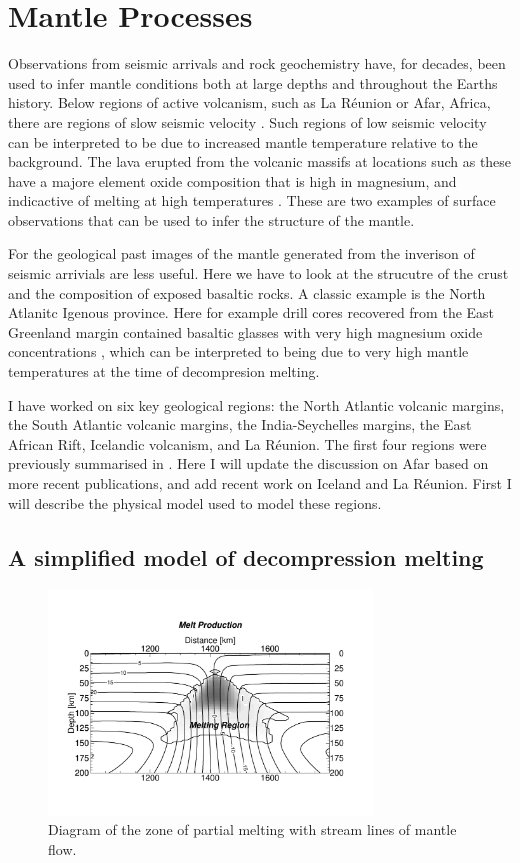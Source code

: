 \section{Mantle Processes}

Observations from seismic arrivals and rock geochemistry have, for decades, been used to infer mantle conditions both at large depths and throughout the Earths history. Below regions of active volcanism, such as La Réunion or Afar, Africa, there are regions of slow seismic velocity \citep[e.g.][]{mazzulo-etal-2019,bastow-etal-??}. Such regions of low seismic velocity can be interpreted to be due to increased mantle temperature relative to the background. The lava erupted from the volcanic massifs at locations such as these have a majore element oxide composition that is high in magnesium, and indicactive of melting at high temperatures \citep[e.g.]{rooney-etal-2010,herberg-??}. These are two examples of surface observations that can be used to infer the structure of the mantle.

For the geological past images of the mantle generated from the inverison of seismic arrivials are less useful. Here we have to look at the strucutre of the crust and the composition of exposed basaltic rocks. A classic example is the North Atlanitc Igenous province. Here for example drill cores recovered from the East Greenland margin contained basaltic glasses with very high magnesium oxide concentrations \citep{fitton-??}, which can be interpreted to being due to very high mantle temperatures at the time of decompresion melting.

I have worked on six key geological regions: the North Atlantic volcanic margins, the South Atlantic volcanic margins, the India-Seychelles margins, the East African Rift, Icelandic volcanism, and La Réunion. The first four regions were previously summarised in \cite{armitage-collier-2017}. Here I will update the discussion on Afar based on more recent publications, and add recent work on Iceland and La Réunion. First I will describe the physical model used to model these regions.

\subsection{A simplified model of decompression melting}

\begin{figure}
\centering
\includegraphics[width=8.6cm]{./figures/ch2-melt-region.pdf}
\caption{Diagram of the zone of partial melting with stream lines of mantle flow.}
\label{fg:melt-region}
\end{figure}

